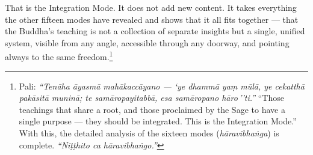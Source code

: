 That is the Integration Mode. It does not add new content. It takes everything the other fifteen modes have revealed and shows that it all fits together --- that the Buddha's teaching is not a collection of separate insights but a single, unified system, visible from any angle, accessible through any doorway, and pointing always to the same freedom.\footnote{Pali: \textit{``Tenāha āyasmā mahākaccāyano --- `ye dhammā yaṃ mūlā, ye cekatthā pakāsitā muninā; te samāropayitabbā, esa samāropano hāro\,''ti.''} ``Those teachings that share a root, and those proclaimed by the Sage to have a single purpose --- they should be integrated. This is the Integration Mode.'' With this, the detailed analysis of the sixteen modes (\textit{hāravibhaṅga}) is complete. \textit{``Niṭṭhito ca hāravibhaṅgo.''}}
